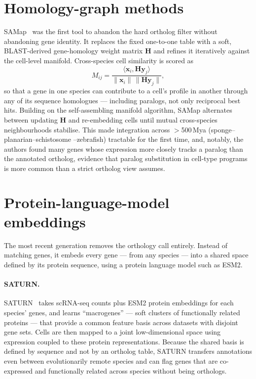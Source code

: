 \documentclass[10pt,twocolumn]{article}
\begin{document}
\section{Homology-graph methods}
SAMap~\cite{tarashansky2021} was the first tool to abandon the hard ortholog filter
without abandoning gene identity. It replaces the fixed one-to-one table with a
soft, BLAST-derived gene-homology weight matrix $\mathbf H$ and refines it
iteratively against the cell-level manifold. Cross-species cell similarity is scored
as
\begin{equation}
M_{ij}=\frac{\langle \mathbf x_i,\mathbf H\mathbf y_j\rangle}
{\lVert \mathbf x_i\rVert\,\lVert \mathbf H\mathbf y_j\rVert},
\label{eq:samap}
\end{equation}
so that a gene in one species can contribute to a cell's profile in another through
any of its sequence homologues --- including paralogs, not only reciprocal best
hits. Building on the self-assembling manifold algorithm, SAMap alternates between
updating $\mathbf H$ and re-embedding cells until mutual cross-species neighbourhoods
stabilise. This made integration across $>$500\,Mya (sponge--planarian--schistosome
--zebrafish) tractable for the first time, and, notably, the authors found many
genes whose expression more closely tracks a paralog than the annotated ortholog,
evidence that paralog substitution in cell-type programs is more common than a
strict ortholog view assumes.

\section{Protein-language-model embeddings}
The most recent generation removes the orthology call entirely. Instead of matching
genes, it embeds every gene --- from any species --- into a shared space defined by
its protein sequence, using a protein language model such as ESM2.

\paragraph{SATURN.}
SATURN~\cite{rosen2024} takes scRNA-seq counts plus ESM2 protein embeddings for each
species' genes, and learns ``macrogenes'' --- soft clusters of functionally related
proteins --- that provide a common feature basis across datasets with disjoint gene
sets. Cells are then mapped to a joint low-dimensional space using expression coupled
to these protein representations. Because the shared basis is defined by sequence and
not by an ortholog table, SATURN transfers annotations even between evolutionarily
remote species and can flag genes that are co-expressed and functionally related
across species without being orthologs.
\end{document}
